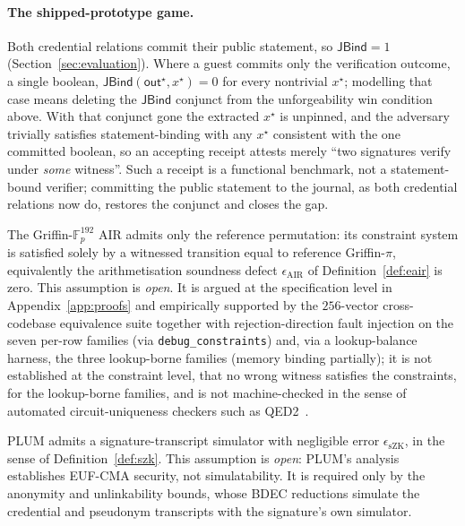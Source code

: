 \paragraph{The shipped-prototype game.}
Both credential relations commit their public statement, so $\mathsf{JBind}=1$ (Section~\ref{sec:evaluation}). Where a guest commits only the verification outcome, a single boolean, $\mathsf{JBind}(\mathsf{out}^\star,x^\star)=0$ for every nontrivial $x^\star$; modelling that case means deleting the $\mathsf{JBind}$ conjunct from the unforgeability win condition above. With that conjunct gone the extracted $x^\star$ is unpinned, and the adversary trivially satisfies statement-binding with any $x^\star$ consistent with the one committed boolean, so an accepting receipt attests merely ``two signatures verify under \emph{some} witness''. Such a receipt is a functional benchmark, not a statement-bound verifier; committing the public statement to the journal, as both credential relations now do, restores the conjunct and closes the gap.

\begin{assumption}\label{asm:air}
    The Griffin-$\mathbb{F}_p^{192}$ AIR admits only the reference permutation: its constraint system is satisfied solely by a witnessed transition equal to reference Griffin-$\pi$, equivalently the arithmetisation soundness defect $\epsilon_{\mathrm{AIR}}$ of Definition~\ref{def:eair} is zero. This assumption is \emph{open}. It is argued at the specification level in Appendix~\ref{app:proofs} and empirically supported by the $256$-vector cross-codebase equivalence suite together with rejection-direction fault injection on the seven per-row families (via \texttt{debug\_constraints}) and, via a lookup-balance harness, the three lookup-borne families (memory binding partially); it is not established at the constraint level, that no wrong witness satisfies the constraints, for the lookup-borne families, and is not machine-checked in the sense of automated circuit-uniqueness checkers such as QED2~\cite{pailoor2023qed2}.
\end{assumption}

\begin{assumption}\label{asm:szk}
    PLUM admits a signature-transcript simulator with negligible error $\epsilon_{\mathrm{sZK}}$, in the sense of Definition~\ref{def:szk}. This assumption is \emph{open}: PLUM's analysis establishes EUF-CMA security, not simulatability. It is required only by the anonymity and unlinkability bounds, whose BDEC reductions simulate the credential and pseudonym transcripts with the signature's own simulator.
\end{assumption}

